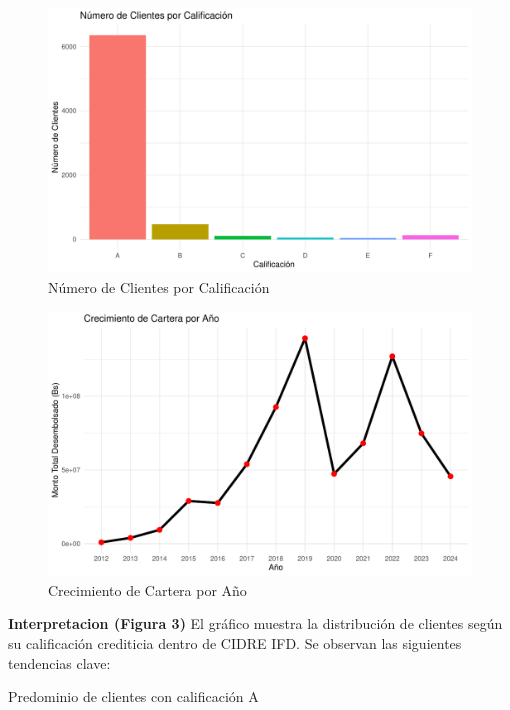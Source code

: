 \documentclass[Royal,times,sageh]{sagej}
\begin{document}
\begin{figure}

{\centering \includegraphics[width=0.9\linewidth]{Mineria2_files/figure-latex/graficos_ajustados-1} 

}

\caption{Número de Clientes por Calificación}\label{fig:graficos_ajustados-1}
\end{figure}
\begin{figure}

{\centering \includegraphics[width=0.9\linewidth]{Mineria2_files/figure-latex/graficos_ajustados-2} 

}

\caption{Crecimiento de Cartera por Año}\label{fig:graficos_ajustados-2}
\end{figure}

\textbf{Interpretacion (Figura 3)} El gráfico muestra la distribución de
clientes según su calificación crediticia dentro de CIDRE IFD. Se
observan las siguientes tendencias clave:

Predominio de clientes con calificación A
\end{document}
